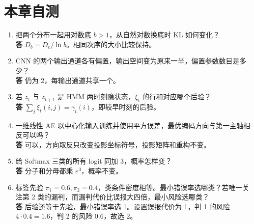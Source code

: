 \documentclass[UTF8,a4paper,zihao=-4,fontset=fandol]{ctexrep}
\begin{document}
\section{本章自测}
\begin{enumerate}
\item 把两个分布一起用对数底 $b>1$，从自然对数换底时 KL 如何变化？\\
\textbf{答} $D_b=D_e/\ln b$。相同次序的大小比较保持。
\item CNN 的两个输出通道各有偏置，输出空间变为原来一半，偏置参数数目是多少？\\
\textbf{答} 仍为 2，每输出通道共享一个。
\item 若 $z_t$ 与 $z_{t+1}$ 是 HMM 两时刻隐状态，$\xi_t$ 的行和对应哪个后验？\\
\textbf{答} $\sum_j\xi_t(i,j)=\gamma_t(i)$，即较早时刻的后验。
\item 一维线性 AE 以中心化输入训练并使用平方误差，最优编码方向与第一主轴相反可以吗？\\
\textbf{答} 可以，方向取反只改变投影坐标符号，投影矩阵和重构不变。
\item 给 Softmax 三类的所有 logit 同加 3，概率怎样变？\\
\textbf{答} 分子和分母都乘 $e^3$，概率不变。
\item 标签先验 $\pi_1=0.6,\pi_2=0.4$，类条件密度相等。最小错误率选哪类？若唯一关注第 2 类的漏判，而漏判代价比误报大四倍，最小风险选哪类？\\
\textbf{答} 后验还等于先验，最小错误率选 1。设置误报代价为 1，判 1 的风险 $4\cdot0.4=1.6$，判 2 的风险 $0.6$，故选 2。
\end{enumerate}
\end{document}
